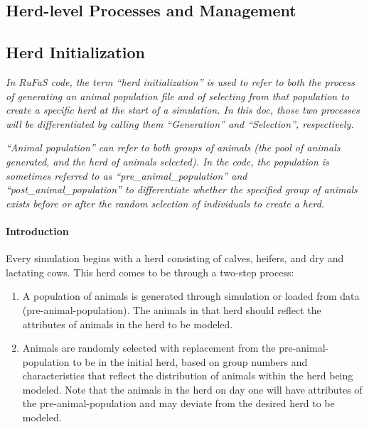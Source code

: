\documentclass{article}
\begin{document}
\begin{refsection}
\section{Herd-level Processes and Management}\label{sec:AnManage}
     
\subsection{Herd Initialization} \label{sec:animalINPUTS}\label{herdinit}

\begin{tcolorbox}[colback=white, colframe=black, title=Important Note]
\textit{In RuFaS code, the term “herd initialization” is used to refer to both the process of generating an animal population file and of selecting from that population to create a specific herd at the start of a simulation. In this doc, those two processes will be differentiated by calling them “Generation” and “Selection”, respectively. }
\vspace{0.2cm}

\textit{“Animal population” can refer to both groups of animals (the pool of animals generated, and the herd of animals selected). In the code, the population is sometimes referred to as “pre\_animal\_population” and “post\_animal\_population” to differentiate whether the specified group of animals exists before or after the random selection of individuals to create a herd. }
\end{tcolorbox}
\vspace{0.2cm}

\paragraph{Introduction}

Every simulation begins with a herd consisting of calves, heifers, and dry and lactating cows. This herd comes to be through a two-step process: 
\begin{enumerate}
    \item A population of animals is generated through simulation or loaded from data (pre-animal-population). The animals in that herd should reflect the attributes of animals in the herd to be modeled. 
    \item Animals are randomly selected with replacement from the pre-animal-population to be in the initial herd, based on group numbers and characteristics that reflect the distribution of animals within the herd being modeled. Note that the animals in the herd on day one will have attributes of the pre-animal-population and may deviate from the desired herd to be modeled.  
\end{enumerate}


\end{refsection}
\end{document}
